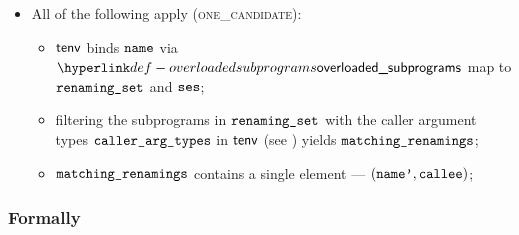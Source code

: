 \begin{itemize}
  \item All of the following apply (\textsc{one\_candidate}):
  \begin{itemize}
    \item $\tenv$ binds $\name$ via $\overloadedsubprograms$ map to $\renamingset$ and $\vses$;
    \item filtering the subprograms in $\renamingset$ with the caller argument types $\callerargtypes$
          in $\tenv$ (see ) yields $\matchingrenamings$\ProseOrTypeError;
    \item $\matchingrenamings$ contains a single element --- $(\namep, \callee)$\ProseOrTypeError;
  \end{itemize}
\end{itemize}

\subsubsection{Formally}
\begin{mathpar}
\end{mathpar}

\begin{mathpar}
\end{mathpar}

\begin{mathpar}
\end{mathpar}

